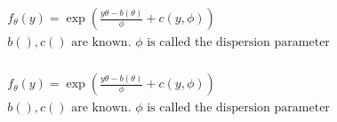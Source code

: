 \newcommand{\vbeta}{\bm{\beta}} 
\newcommand{\vbhat}{\bm{\hat \beta}}
\newcommand{\vbstar}{\bm{\beta^*}}
\newcommand{\veps}{\bm{\epsilon}}
\newcommand{\vmu}{\bm{\mu}}
\newcommand{\vtheta}{\bm{\theta}}
\newcommand{\valpha}{\bm{\alpha}}
\newcommand{\vdelta}{\bm{\delta}}

\newcommand{\vzero}{\mathbf{0}}
\newcommand{\vone}{\mathbf{1}}
\newcommand{\thetac}{\mathrm{\theta^{(0)}}}


\newcommand{\mA}{\mathds{A}} \newcommand{\mB}{\mathds{B}} \newcommand{\mC}{\mathds{C}} \newcommand{\mD}{\mathds{D}} \newcommand{\mE}{\mathds{E}} \newcommand{\mF}{\mathds{F}} \newcommand{\mG}{\mathds{G}} \newcommand{\mH}{\mathds{H}} \newcommand{\mI}{\mathds{I}} \newcommand{\mJ}{\mathds{J}} \newcommand{\mK}{\mathds{K}} \newcommand{\mL}{\mathds{L}} \newcommand{\mM}{\mathds{M}} \newcommand{\mN}{\mathds{N}} \newcommand{\mO}{\mathds{O}} \newcommand{\mP}{\mathds{P}} \newcommand{\mQ}{\mathds{Q}} \newcommand{\mR}{\mathds{R}} \newcommand{\mS}{\mathds{S}} \newcommand{\mT}{\mathds{T}} \newcommand{\mU}{\mathds{U}} \newcommand{\mV}{\mathds{V}} \newcommand{\mW}{\mathds{W}} \newcommand{\mX}{\mathds{X}} \newcommand{\mY}{\mathds{Y}} \newcommand{\mZ}{\mathds{Z}}

\newcommand{\msigma}{\Sigma}
\newcommand{\mbeta}{\mathds{B}}

\newcommand{\argmax}{\mathop{\mathrm{argmax}}}
\newcommand{\argmin}{\mathop{\mathrm{argmin}}}

\newcommand{\deq}{:=}
\newcommand{\conv}[2]{{#1 * #2}} %


\begin {equation} \begin {split} 
& f_\theta(y) = \exp (\frac {y \theta - b(\theta)} {\phi} + c(y, \phi)) \\
& b(), c() \text { are known. $\phi$ is called the dispersion parameter} \\
\end {split} \end {equation}

\begin {equation} \begin {split} 
& f_\theta(y) = \exp (\frac {y \theta - b(\theta)} {\phi} + c(y, \phi)) \\
& b(), c() \text { are known. $\phi$ is called the dispersion parameter} \\
\end {split} \end {equation}

